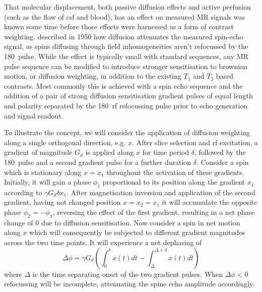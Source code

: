 That molecular displacement, both passive diffusion effects and active perfusion (such as the flow of \gls{csf} and blood\autocite{LeBihan1988}), has an effect on measured MR signals was known some time before those effects were harnessed as a form of contrast weighting.
\textcite{Hahn1950} described in 1950 how diffusion attenuates the measured spin-echo signal, as spins diffusing through field inhomogeneities aren't refocussed by the 180\textdegree\ pulse.
While the effect is typically small with standard sequences, any MR pulse sequence can be modified to introduce stronger sensitisation to brownian motion, or diffusion weighting, in addition to the existing $T_1$ and $T_2$ based contrasts.
Most commonly this is achieved with a spin echo sequence and the addition of a pair of strong diffusion sensitisation gradient pulses of equal length and polarity separated by the 180\textdegree\ \gls{rf} refocussing pulse prior to echo generation and signal readout.

To illustrate the concept, we will consider the application of diffusion weighting along a single orthogonal direction, e.g. $x$.
After slice selection and \gls{rf} excitation, a gradient of magnitude $G_d$ is applied along $x$ for time period $\delta$, followed by the 180\textdegree\ pulse and a second gradient pulse for a further duration $\delta$.
Consider a spin which is stationary along $x=x_1$ throughout the activation of these gradients.
Initially, it will gain a phase $\phi_1$ proportional to its position along the gradient $x_1$ according to $\gamma G_d \delta x_1$.
After magnetisation inversion and application of the second gradient, having not changed position $x=x_2=x_1$ it will accumulate the opposite phase $\phi_2 = -\phi_1$, reversing the effect of the first gradient, resulting in a net phase change of $0$ due to diffusion sensitisation.
Now consider a spin in net motion along $x$ which will consequently be subjected to different gradient magnitudes across the two time points.
It will experience a net dephasing of
\begin{equation}
  \Delta\phi = \gamma G_d (\int_0^{\delta} x(t) dt - \int_{\Delta}^{\Delta+\delta} x(t) dt)
\end{equation}
where $\Delta$ is the time separating onset of the two gradient pulses.
When $\Delta\phi < 0$ refocussing will be incomplete, attenuating the spine echo amplitude accordingly.

